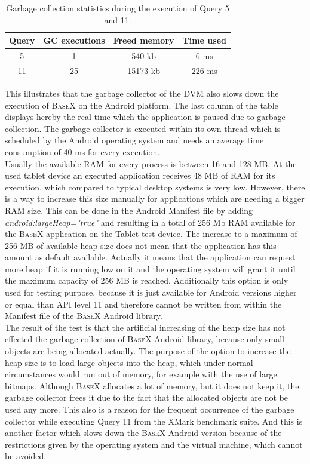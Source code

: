 \begin{table}[htpb]
	\centering
	\begin{tabular}{|c|c|c|c|}
		\hline
		Query&GC executions&Freed memory&Time used\\
		\hline
		5&1&540 kb&6 ms\\
		\hline
		11&25&15173 kb&226 ms\\
		\hline
	\end{tabular}
	\caption{Garbage collection statistics during the execution of Query 5 and 11.}
	\label{tab:gc-stats}
\end{table}

This illustrates that the garbage collector of the DVM also slows down the execution of \textsc{BaseX} on the Android platform.
The last column of the table displays hereby the real time which the application is paused due to garbage collection.
The garbage collector is executed within its own thread which is scheduled by the Android operating system and needs an average time consumption of 40 ms for every execution.\\
Usually the available RAM for every process is between 16 and 128 MB.
At the used tablet device an executed application receives 48 MB of RAM for its execution, which compared to typical desktop systems is very low.
However, there is a way to increase this size manually for applications which are needing a bigger RAM size.
This can be done in the Android Manifest file by adding \textit{android:largeHeap="true"} and resulting in a total of 256 Mb RAM available for the \textsc{BaseX} application on the Tablet test device.
The increase to a maximum of 256 MB of available heap size does not mean that the application has this amount as default available.
Actually it means that the application can request more heap if it is running low on it and the operating system will grant it until the maximum capacity of 256 MB is reached.
Additionally this option is only used for testing purpose, because it is just available for Android versions higher or equal than API level 11 and therefore cannot be written from within the Manifest file of the \textsc{BaseX} Android library.\\
The result of the test is that the artificial increasing of the heap size has not effected the garbage collection of \textsc{BaseX} Android library, because only small objects are being allocated actually.
The purpose of the option to increase the heap size is to load large objects into the heap, which under normal circumstances would run out of memory, for example with the use of large bitmaps.
Although \textsc{BaseX} allocates a lot of memory, but it does not keep it, the garbage collector frees it due to the fact that the allocated objects are not be used any more.
This also is a reason for the frequent occurrence of the garbage collector while executing Query 11 from the XMark benchmark suite.
And this is another factor which slows down the \textsc{BaseX} Android version because of the restrictions given by the operating system and the virtual machine, which cannot be avoided.



